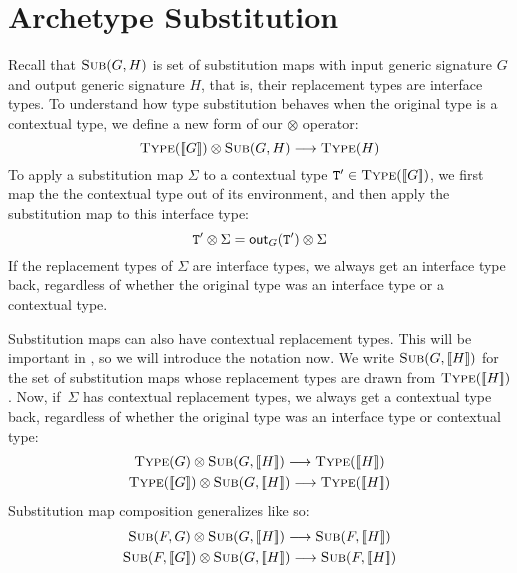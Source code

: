 \documentclass[../generics]{subfiles}
\begin{document}
\section{Archetype Substitution}\label{archetypesubst}

Recall that $\textsc{Sub}({G, H})$ is set of substitution maps with input generic signature $G$ and output generic signature $H$, that is, their replacement types are interface types. To understand how type substitution behaves when the original type is a contextual type, we define a new form of our $\otimes$ operator:
\[
\textsc{Type}({[\![G]\!]})\otimes\textsc{Sub}({G, H})\longrightarrow\textsc{Type}({H})
\]
To apply a substitution map $\Sigma$ to a contextual type $\texttt{T}^\prime\in\textsc{Type}({[\![G]\!]})$, we first map the the contextual type out of its environment, and then apply the substitution map to this interface type:
\[\texttt{T}^\prime\otimes \Sigma = \mathsf{out}_G(\texttt{T}^\prime)\otimes \Sigma\]
If the replacement types of $\Sigma$ are interface types, we always get an interface type back, regardless of whether the original type was an interface type or a contextual type.

Substitution maps can also have contextual replacement types. This will be important in , so we will introduce the notation now. We write $\textsc{Sub}({G, [\![H]\!]})$ for the set of substitution maps whose replacement types are drawn from $\textsc{Type}({[\![H]\!]})$. Now, if~$\Sigma$ has contextual replacement types, we always get a contextual type back, regardless of whether the original type was an interface type or contextual type:
\begin{gather*}
\TypeObj{G}\otimes\SubMapObj{G}{\EquivClass{H}}\longrightarrow\TypeObj{\EquivClass{H}}\\
\TypeObj{\EquivClass{G}}\otimes\SubMapObj{G}{\EquivClass{H}}\longrightarrow\TypeObj{\EquivClass{H}}
\end{gather*}
Substitution map composition generalizes like so:
\begin{gather*}
\SubMapObj{F}{G}\otimes\SubMapObj{G}{\EquivClass{H}}\longrightarrow\SubMapObj{F}{\EquivClass{H}}\\
\SubMapObj{F}{\EquivClass{G}}\otimes\SubMapObj{G}{\EquivClass{H}}\longrightarrow\SubMapObj{F}{\EquivClass{H}}
\end{gather*}
\end{document}
